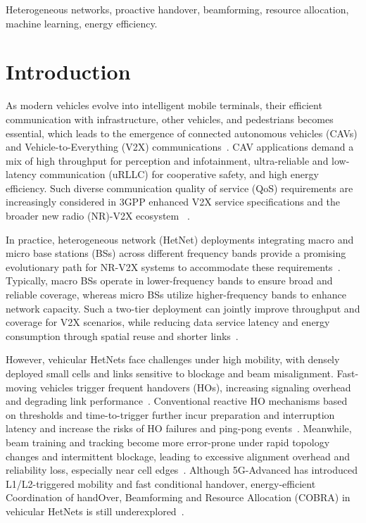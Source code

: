 \documentclass[conference, a4paper]{IEEEtran}
\theoremstyle{remark}
\begin{document}
\begin{IEEEkeywords}
Heterogeneous networks, proactive handover, beamforming, resource allocation, machine learning, energy efficiency.
\end{IEEEkeywords}

\section{Introduction}

As modern vehicles evolve into intelligent mobile terminals, their efficient communication with infrastructure, other vehicles, and pedestrians becomes essential, which leads to the emergence of connected autonomous vehicles (CAVs) and Vehicle-to-Everything (V2X) communications~\cite{c-v2x}. CAV applications demand a mix of high throughput for perception and infotainment, ultra-reliable and low-latency communication (uRLLC) for cooperative safety, and high energy efficiency. Such diverse communication quality of service (QoS) requirements are increasingly considered in 3GPP enhanced V2X service specifications and the broader new radio (NR)-V2X ecosystem
~\cite{3GPP-TS-22.186,bagheri2020nrv2x}. 

In practice, heterogeneous network (HetNet) deployments integrating macro and micro base stations (BSs) across different frequency bands provide a promising evolutionary path for NR-V2X systems to accommodate these requirements~\cite{3GPP-TR-38.913}. Typically, macro BSs operate in lower-frequency bands to ensure broad and reliable coverage, whereas micro BSs utilize higher-frequency bands to enhance network capacity. 
Such a two-tier deployment can jointly improve throughput and coverage for V2X scenarios, while reducing data service latency and energy consumption through spatial reuse and shorter links~\cite{xu2021survey,niu2015}.

However, vehicular HetNets face challenges under high mobility, with densely deployed small cells and links sensitive to blockage and beam misalignment. Fast-moving vehicles trigger frequent handovers (HOs), increasing signaling overhead and degrading link performance~\cite{hasan2018frequent,nan2023}. 
Conventional reactive HO mechanisms based on thresholds and time-to-trigger further incur preparation and interruption latency and increase the risks of HO failures and ping-pong events~\cite{lee2020prediction}. 
Meanwhile, beam training and tracking become more error-prone under rapid topology changes and intermittent blockage, leading to excessive alignment overhead and reliability loss, especially near cell edges~\cite{elayach2014twc,alrabeiah2020tcom}. 
Although 5G-Advanced has introduced L1/L2-triggered mobility and fast conditional handover, energy-efficient {C}oordination of hand{O}ver, {B}eamforming and {R}esource {A}llocation (COBRA) in vehicular HetNets is still underexplored~\cite{manalastas2020go, fiandrino2023cho,cho2022stanczak}. 
\end{document}
